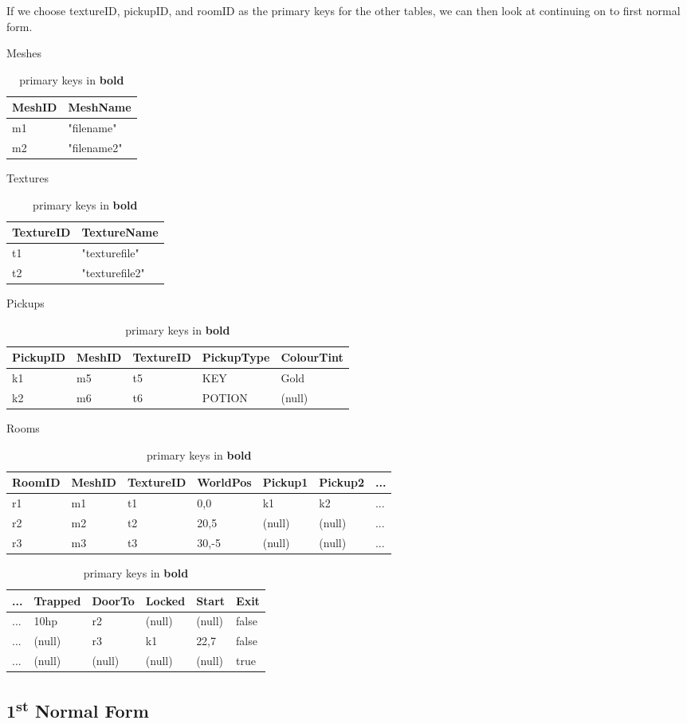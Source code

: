 If we choose textureID, pickupID, and roomID as the primary keys for the other
tables, we can then look at continuing on to first normal form.

\begin{table}[h]\footnotesize
Meshes\\
\begin{tabular}{ll}
\bf{MeshID}&MeshName\\
\hline
m1&"filename"\\
m2&"filename2"\\
\end{tabular}
Textures\\
\begin{tabular}{ll}
\bf{TextureID}&TextureName\\
\hline
t1&"texturefile"\\
t2&"texturefile2"\\
\end{tabular}
Pickups\\
\begin{tabular}{lllll}
\bf{PickupID}&MeshID&TextureID&PickupType&ColourTint\\
\hline
k1&m5&t5&KEY&Gold\\
k2&m6&t6&POTION&(null)\\
\end{tabular}
Rooms \\
\begin{tabular}{lllllll}
\bf{RoomID}&MeshID&TextureID&WorldPos&Pickup1&Pickup2&... \\
\hline
r1&m1&t1&0,0&k1&k2&... \\
r2&m2&t2&20,5&(null)&(null)&... \\
r3&m3&t3&30,-5&(null)&(null)&... \\
\end{tabular}
\begin{tabular}{llllll}
...&Trapped&DoorTo&Locked&Start&Exit \\
\hline
...&10hp&r2&(null)&(null)&false \\
...&(null)&r3&k1&22,7&false \\
...&(null)&(null)&(null)&(null)&true \\
\end{tabular}
\caption{primary keys in \bf{bold}}
\end{table}

\subsection{1\textsuperscript{st} Normal Form}

